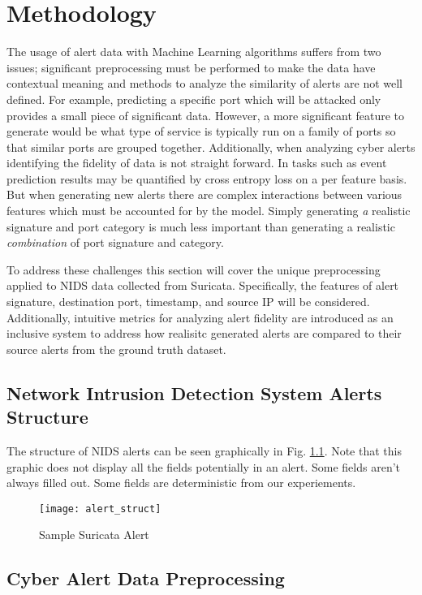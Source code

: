 \chapter{Methodology}
\label{sec:meth}

The usage of alert data with Machine Learning algorithms suffers from two issues; significant preprocessing must be performed to make the data have contextual meaning and methods to analyze the similarity of alerts are not well defined. For example, predicting a specific port which will be attacked only provides a small piece of significant data. However, a more significant feature to generate would be what type of service is typically run on a family of ports so that similar ports are grouped together. Additionally, when analyzing cyber alerts identifying the fidelity of data is not straight forward. In tasks such as event prediction results may be quantified by cross entropy loss on a per feature basis. But when generating new alerts there are complex interactions between various features which must be accounted for by the model. Simply generating \emph{a} realistic signature and port category is much less important than generating a realistic \emph{combination} of port signature and category. 

To address these challenges this section will cover the unique preprocessing applied to NIDS data collected from Suricata. Specifically, the features of alert signature, destination port, timestamp, and source IP will be considered. Additionally, intuitive metrics for analyzing alert fidelity are introduced as an inclusive system to address how realisitc generated alerts are compared to their source alerts from the ground truth dataset. 

\section{Network Intrusion Detection System Alerts Structure}

The structure of NIDS alerts can be seen graphically in Fig. \ref{fig:alert}. Note that this graphic does not display all the fields potentially in an alert. Some fields aren't always filled out. Some fields are deterministic from our experiements. 

\begin{figure}
	\centering
	\label{fig:alert}
	\texttt{[image: alert\_struct]}
	\caption{Sample Suricata Alert}
\end{figure}

\section{Cyber Alert Data Preprocessing}


